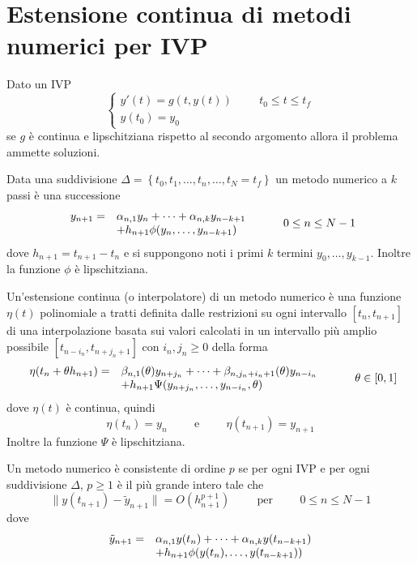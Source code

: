 \chapter{Estensione continua di metodi numerici per IVP}

Dato un IVP
$$
\begin{cases}
 y'(t)=g(t,y(t))	\hspace{1cm}	t_0 \le t \le t_f	\\
 y(t_0)=y_0
\end{cases}
$$
se $g$ è continua e lipschitziana rispetto al secondo argomento allora il problema ammette soluzioni.

\begin{defn}
 Data una suddivisione $\Delta= \left \{ t_0, t_1, \dots , t_n , \dots , t_N = t_f \right \}$  
un metodo numerico a $k$ passi è una successione
$$
\begin{array}{c lc}
y_{n+1} = & \alpha_{n,1} y_n + \dots +\alpha_{n,k} y_{n-k+1} \\
	  & + h_{n+1} \phi (y_n, \dots , y_{n-k+1})
\end{array}
\hspace{1cm}
0 \le n \le N-1
$$
dove $h_{n+1}=t_{n+1}-t_n$ e si suppongono noti i primi $k$ termini $y_0, \dots , y_{k-1}$.
Inoltre la funzione $\phi$ è lipschitziana.
\end{defn}

\begin{defn}
Un'estensione continua (o interpolatore) di un metodo numerico è una funzione $\eta(t)$ 
polinomiale a tratti definita dalle restrizioni su ogni intervallo $[t_n,t_{n+1}]$ di una interpolazione 
basata sui valori calcolati in un intervallo più amplio possibile $[t_{n-i_n},t_{n+j_n+1}]$ con 
$i_n,j_n \geq 0$ della forma
$$
\begin{array}{c lc}
\eta(t_n+\theta h_{n+1}) = & \beta_{n,1} (\theta) y_{n+j_n} + \dots + \beta_{n,j_n + i_n + 1} (\theta) y_{n-i_n} \\
			 & + h_{n+1} \Psi (y_{n+j_n}, \dots , y_{n-i_n}, \theta)
\end{array}
\hspace{1cm}	\theta \in [0,1] 
$$
dove $\eta(t)$ è continua, quindi
$$
\eta(t_n)=y_n	\hspace{1cm}	\mbox{e}	\hspace{1cm} \eta(t_{n+1})=y_{n+1}
$$
Inoltre la funzione $\Psi$ è lipschitziana.
\end{defn}

\begin{defn}
 Un metodo numerico è consistente di ordine $p$ se per ogni IVP e per ogni suddivisione $\Delta$, 
 $p \geq 1$ è il più grande intero tale che 
 $$
 \| y(t_{n+1}) - \tilde{y}_{n+1}  \| = O(h_{n+1}^{p+1})
\hspace{1cm}	
\mbox{per}
\hspace{1cm}
0 \le n \le N-1
 $$
dove
$$
\begin{array}{c lc}
\tilde{y}_{n+1} = 	&	\alpha_{n,1} y(t_n) + \dots +\alpha_{n,k} y (t_{n-k+1}) \\ 
			&	+h_{n+1} \phi (y(t_n), \dots , y(t_{n-k+1}))
\end{array}
$$
\end{defn}

